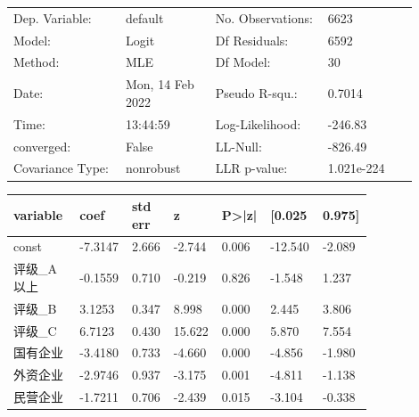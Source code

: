 \begin{center}
	\small	\begin{tabular}{p{0.25\linewidth}p{0.2\linewidth}p{0.25\linewidth}p{0.2\linewidth}}
		\hline
		Dep. Variable:   & default          & No. Observations: & 6623       \\
		Model:           & Logit            & Df Residuals:     & 6592       \\
		Method:          & MLE              & Df Model:         & 30         \\
		Date:            & Mon, 14 Feb 2022 & Pseudo R-squ.:    & 0.7014     \\
		Time:            & 13:44:59         & Log-Likelihood:   & -246.83    \\
		converged:       & False            & LL-Null:          & -826.49    \\
		Covariance Type: & nonrobust        & LLR p-value:      & 1.021e-224 \\
	\end{tabular}
	\begin{longtable}{p{0.18\linewidth}p{0.1\linewidth}p{0.1\linewidth}p{0.1\linewidth}p{0.1\linewidth}p{0.12\linewidth}p{0.1\linewidth}}
		\hline
		\textbf{variable}  & \textbf{coef} & \textbf{std err} & \textbf{z} & \textbf{P>|z|} & \textbf{[0.025} & \textbf{0.975]} \\ \hline
		const              & -7.3147       & 2.666            & -2.744     & 0.006          & -12.540         & -2.089          \\ \hline
		评级\_A以上        & -0.1559       & 0.710            & -0.219     & 0.826          & -1.548          & 1.237           \\ \hline
		评级\_B            & 3.1253        & 0.347            & 8.998      & 0.000          & 2.445           & 3.806           \\ \hline
		评级\_C            & 6.7123        & 0.430            & 15.622     & 0.000          & 5.870           & 7.554           \\ \hline
		国有企业           & -3.4180       & 0.733            & -4.660     & 0.000          & -4.856          & -1.980          \\ \hline
		外资企业           & -2.9746       & 0.937            & -3.175     & 0.001          & -4.811          & -1.138          \\ \hline
		民营企业           & -1.7211       & 0.706            & -2.439     & 0.015          & -3.104          & -0.338          \\ \hline

\end{longtable}
\end{center}
